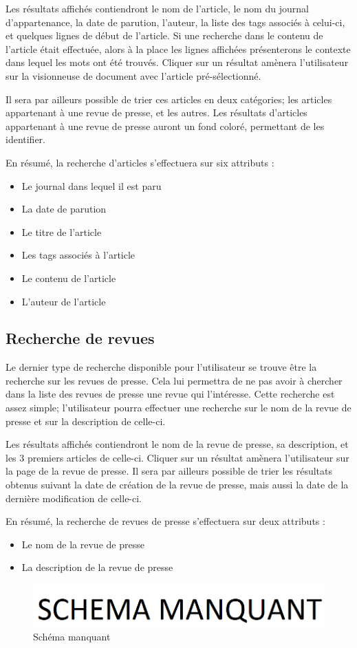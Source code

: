 Les résultats affichés contiendront le nom de l'article, le nom du journal d'appartenance, la date de parution, l'auteur, la liste des tags associés à celui-ci, et quelques lignes de début de l'article. Si une recherche dans le contenu de l'article était effectuée, alors à la place les lignes affichées présenterons le contexte dans lequel les mots ont été trouvés. Cliquer sur un résultat amènera l'utilisateur sur la visionneuse de document avec l'article pré-sélectionné.

Il sera par ailleurs possible de trier ces articles en deux catégories; les articles appartenant à une revue de presse, et les autres. Les résultats d'articles appartenant à une revue de presse auront un fond coloré, permettant de les identifier.

En résumé, la recherche d'articles s'effectuera sur six attributs :
\begin{itemize}
	\item Le journal dans lequel il est paru
	\item La date de parution
	\item Le titre de l'article
	\item Les tags associés à l'article
	\item Le contenu de l'article
	\item L'auteur de l'article
\end{itemize}

\subsection{Recherche de revues}
\label{sec:recherche_revue}

Le dernier type de recherche disponible pour l'utilisateur se trouve être la recherche sur les revues de presse. Cela lui permettra de ne pas avoir à chercher dans la liste des revues de presse une revue qui l'intéresse. Cette recherche est assez simple; l'utilisateur pourra effectuer une recherche sur le nom de la revue de presse et sur la description de celle-ci.

Les résultats affichés contiendront le nom de la revue de presse, sa description, et les 3 premiers articles de celle-ci. Cliquer sur un résultat amènera l'utilisateur sur la page de la revue de presse. Il sera par ailleurs possible de trier les résultats obtenus suivant la date de création de la revue de presse, mais aussi la date de la dernière modification de celle-ci.

En résumé, la recherche de revues de presse s'effectuera sur deux attributs :
\begin{itemize}
	\item Le nom de la revue de presse
	\item La description de la revue de presse
\end{itemize}

    \begin{figure}[H]
        \centering
        \includegraphics[width=\textwidth]{figures/manquant.png}
            \caption{Schéma manquant}
            \label{fig:manquant}
    \end{figure}